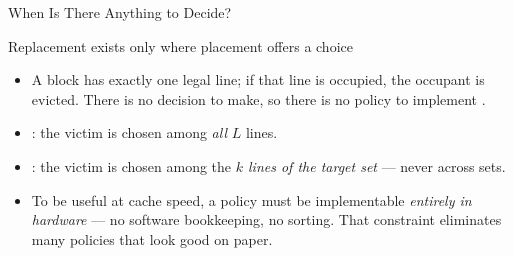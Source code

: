 \documentclass[aspectratio=169]{beamer}
\begin{document}
\begin{frame}{When Is There Anything to Decide?}
  \begin{block}{Replacement exists only where placement offers a choice}
    \begin{itemize}
      \item {} A
        block has exactly one legal line; if that line is occupied, the
        occupant is evicted. There is no decision to make, so there is no
        policy to implement
        \cite[\S5.2 Replacement Algorithms, PDF p.~203]{Stallings2015_computer_organization}.
      \item {}: the victim is chosen among \emph{all}
        $L$ lines.
      \item {}: the victim is chosen among the
        \emph{$k$ lines of the target set} --- never across sets.
    \end{itemize}
  \end{block}
  \begin{itemize}
    \item To be useful at cache speed, a policy must be implementable
      \emph{entirely in hardware} --- no software bookkeeping, no sorting.
      That constraint eliminates many policies that look good on paper.
  \end{itemize}
\end{frame}
\end{document}

